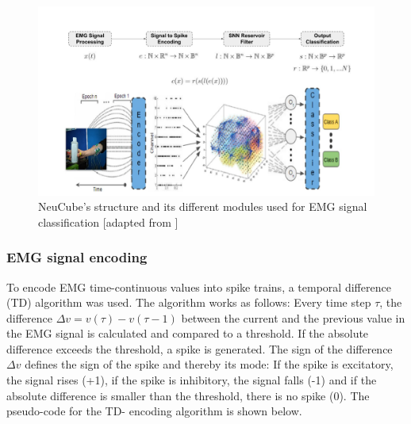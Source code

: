 \documentclass[journal,article,submit,moreauthors,pdftex,10pt,a4paper]{Definitions/mdpi}
\begin{document}
\begin{figure}[H]
    \centering
    \includegraphics [width=0.9\linewidth]{diagram4.pdf}
    \caption{NeuCube's structure and its different modules used for EMG signal classification [adapted from \cite{6}]
}
    \label{FIG:diagram4.pdf}
\end{figure}

\subsubsection{EMG signal encoding}
To encode EMG time-continuous values into spike trains, a temporal difference (TD) algorithm was used. The algorithm works as follows:
Every time step $\tau$, the difference $\Delta v = v(\tau) - v(\tau-1)$ between the current and the previous value in the EMG signal is calculated and compared to a threshold. If the absolute difference exceeds the threshold, a spike is generated. The sign of the difference $\Delta v$ defines the sign of the spike and thereby its mode: If the spike is excitatory, the signal rises (+1), if the spike is inhibitory, the signal falls (-1) and if the absolute difference is smaller than the threshold, there is no spike (0). The pseudo-code for the TD- encoding algorithm is shown below. 
\end{document}
